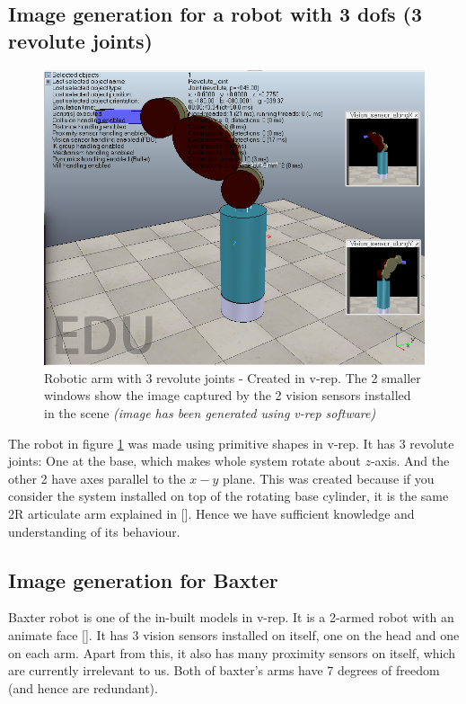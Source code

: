 \documentclass[12pt]{article}
\begin{document}
\subsection{Image generation for a robot with 3 dofs (3 revolute joints)}

\begin{figure}[h]
  \includegraphics[width=\columnwidth]{graphics/3dof}
  \caption{Robotic arm with 3 revolute joints - Created in v-rep. The 2 smaller windows show the image captured by the 2 vision sensors installed in the scene \textit{\small{(image has been generated using v-rep software)}}}
  \label{3dof}
\end{figure}
The robot in figure \ref{3dof} was made using primitive shapes in v-rep.
It has 3 revolute joints:
One at the base, which makes whole system rotate about $z$-axis. And the other 2 have axes parallel to the $x-y$ plane.
This was created because if you consider the system installed on top of the rotating base cylinder, it is the same 2R articulate arm explained in [\cite{deb}]. Hence we have sufficient knowledge and understanding of its behaviour.

\subsection{Image generation for Baxter}
Baxter robot is one of the in-built models in v-rep.
It is a 2-armed robot with an animate face [\cite{wiki_Baxter}].
It has 3 vision sensors installed on itself, one on the head and one on each arm. Apart from this, it also has many proximity sensors on itself, which are currently irrelevant to us.
Both of baxter's arms have 7 degrees of freedom (and hence are redundant).
\end{document}
